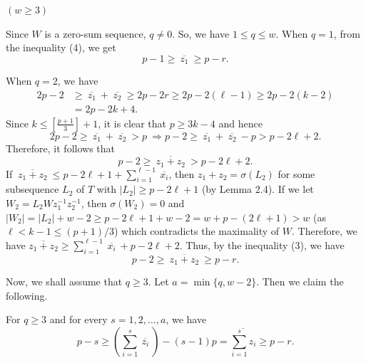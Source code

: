 \documentclass[fleqn]{mat01}
\begin{document}
\begin{pot}
{\begin{case}{\rm
$(w\geq 3)$}
\end{case}

\noindent Since $W$ is a zero-sum sequence, $q\ne 0$. So, we have $1\leq
q\leq w$. When $q =1$, from the inequality (4), we get
\begin{equation}
p-1 \geq  \ \overline{z_1} \  \geq p-r.
\end{equation}

When $q = 2$, we have
\begin{align*}
2p-2 &\geq \ \overline{z_1} \ + \ \overline{z_2} \ \geq 2p -2r\geq 2p -
2(\ell-1)\geq 2p-2(k-2)\\[.3pc]
&= 2p -2k+4.
\end{align*}
Since $k\leq \left[\frac{p+1}3\right]+1$, it is clear that $p\geq 3k-4$
and hence
\begin{equation*}
2p-2\geq \ \overline{z_1} \ + \ \overline{z_2} \ > p \ \Longrightarrow
p-2\geq \ \overline{z_1} \ + \ \overline{z_2} \ - p > p- 2\ell+2.
\end{equation*}
Therefore, it follows that
\begin{equation*}
p-2\geq \ \overline{z_1+z_2} \ > p-2\ell+2.
\end{equation*}
If $\ \overline{z_1+z_2} \ \leq p-2\ell+1+\sum_{i=1}^{\ell-1} \
\overline{x_i}$, then $z_1+z_2 = \sigma(L_2)$ for some subsequence $L_2$
of $T$ with $|L_2|\geq p-2\ell+1$ (by Lemma 2.4). If we let $W_2 =
L_2Wz_1^{-1} z_2^{-1}$, then $\sigma(W_2)= 0$ and $|W_2|=|L_2|+w-2 \geq
p-2\ell+1+w -2 = w+p-(2\ell+1) > w$ (as $\ell < k-1\leq (p+1)/3$) which
contradicts the maximality of $W$. Therefore, we have
$\overline{z_1+z_2} \geq \sum_{i=1}^{\ell-1} \ \overline{x_i} \ +
p-2\ell+2$. Thus, by the inequality (3), we have
\begin{equation}
p-2\geq \ \overline{z_1+z_2} \ \geq p-r.
\end{equation}

Now, we shall assume that $q\geq 3$. Let $a = \min\{q,w-2\}$. Then we
claim the following.

\begin{cla}{\rm For $q\geq 3$ and for every $s = 1,2,\ldots,a$, we have
\begin{equation*}
p -s \geq \left(\sum_{i=1}^s \ \overline{z_i} \ \right) - (s-1)p =
\overline{\sum_{i=1}^sz_i} \geq p-r.
\end{equation*}}
\end{cla}

}
\end{pot}
\end{document}
